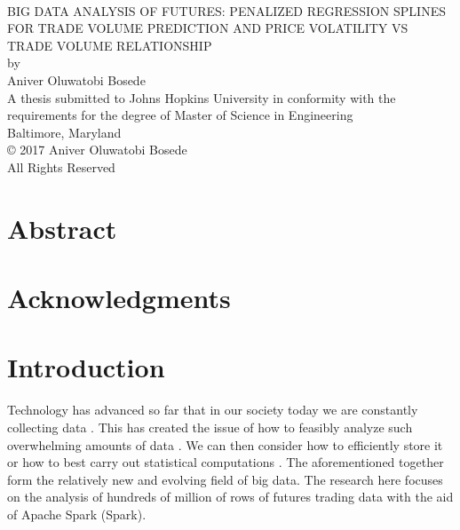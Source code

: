 \documentclass[12pt]{article}
\begin{document}
\

\begin{center}
	\uppercase {Big data analysis of futures: Penalized Regression Splines for trade Volume Prediction and Price Volatility vs trade volume relationship}\\
	\vspace{1in}
	by\\
	Aniver Oluwatobi Bosede\\
	\vspace{1.5in}
	A thesis submitted to Johns Hopkins University in conformity with the requirements for the degree of Master of Science in Engineering\\
	\vspace{.5in}
	Baltimore, Maryland\\
	\vspace{2in}
	\copyright{} 2017 Aniver Oluwatobi Bosede\\
	All Rights Reserved
\end{center}
\newpage
{}
\setcounter{page}{2}

\section*{Abstract}
\newpage

\section*{Acknowledgments}
 
\newpage

\tableofcontents
\newpage
\begingroup
\renewcommand\numberline[1]{}
\listoftables
\newpage
\listoffigures
\endgroup
\newpage

\setcounter{page}{1}
\section*{Introduction}
Technology has advanced so far that in our society today we are constantly collecting data \cite{economist_10}. This has created the issue of how to feasibly analyze such overwhelming amounts of data \cite{economist_10}. We can then consider how to efficiently store it or how to best carry out statistical computations \cite{zaharia2016apache}. The aforementioned together form the relatively new and evolving field of big data. The research here focuses on the analysis of hundreds of million of rows of futures trading data with the aid of Apache Spark (Spark). 
\end{document}
